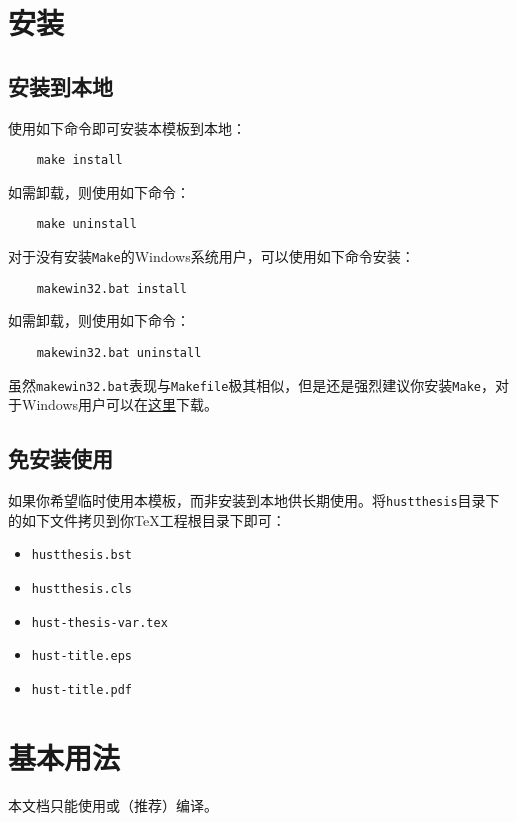 \documentclass[12pt,a4paper,numbered,full]{l3doc}
\begin{document}
\section{安装}

\subsection{安装到本地}

使用如下命令即可安装本模板到本地：
\begin{verbatim}
    make install
\end{verbatim}
如需卸载，则使用如下命令：
\begin{verbatim}
    make uninstall
\end{verbatim}

对于没有安装\verb+Make+的Windows系统用户，可以使用如下命令安装：
\begin{verbatim}
    makewin32.bat install
\end{verbatim}
如需卸载，则使用如下命令：
\begin{verbatim}
    makewin32.bat uninstall
\end{verbatim}
虽然\verb+makewin32.bat+表现与\verb+Makefile+极其相似，但是还是强烈建议你安装\verb+Make+，对于Windows用户可以在\href{http://gnuwin32.sourceforge.net/packages/make.htm}{这里}下载。

\subsection{免安装使用}

如果你希望临时使用本模板，而非安装到本地供长期使用。将\verb+hustthesis+目录下的如下文件拷贝到你\TeX{}工程根目录下即可：
\begin{itemize}
    \item \verb+hustthesis.bst+
    \item \verb+hustthesis.cls+
    \item \verb+hust-thesis-var.tex+
    \item \verb+hust-title.eps+
    \item \verb+hust-title.pdf+
\end{itemize}

\section{基本用法}

\begin{importantnote}
本文档只能使用\textnormal{\XeLaTeX}或\textnormal{\LuaLaTeX}（推荐）编译。
\end{importantnote}
\end{document}

